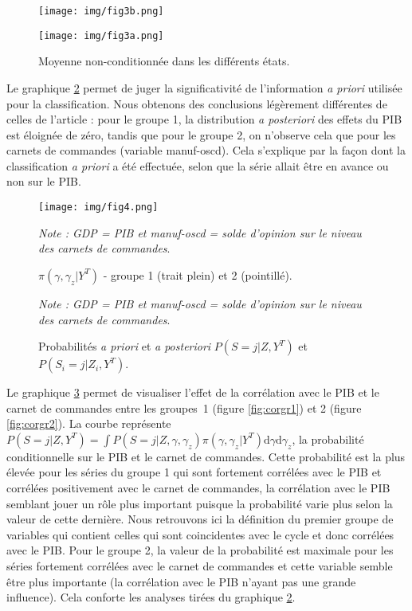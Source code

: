 \documentclass[10pt,french,french]{article}
\begin{document}
\begin{figure}[htb]
\begin{minipage}{.5\textwidth}
\texttt{[image: img/fig3b.png]}
\end{minipage}
\hfill
\begin{minipage}{.5\textwidth}
\texttt{[image: img/fig3a.png]}
\end{minipage}
\caption{Moyenne non-conditionnée dans les différents états.}
\label{etats}
\end{figure}

Le graphique \ref{pi-gamma} permet de juger la significativité de l'information \emph{a priori} utilisée pour la classification.
Nous obtenons des conclusions légèrement différentes de celles de l'article : pour le groupe 1, la distribution \emph{a posteriori} des effets du PIB est éloignée de zéro, tandis que pour le groupe 2, on n'observe cela que pour les carnets de commandes (variable manuf-oscd).
Cela s'explique par la façon dont la classification \emph{a priori} a été effectuée, selon que la série allait être en avance ou non sur le PIB.

\begin{figure}[htb]
\centering
\texttt{[image: img/fig4.png]}
\caption{$\pi(\gamma,\gamma_z|Y^T)$ - groupe 1 (trait plein) et 2 (pointillé).}
\label{pi-gamma}
\footnotesize
\emph{Note : GDP = PIB et manuf-oscd = solde d'opinion sur le niveau des carnets de commandes}.
\end{figure}

\begin{figure}[htb] \centering
{}
\caption{Probabilités \textit{a priori} et \textit{a posteriori} $P(S = j|Z,Y^T)$ et $P(S_i = j|Z_i,Y^T)$.}
\label{graph3d}
\footnotesize
\emph{Note : GDP = PIB et manuf-oscd = solde d'opinion sur le niveau des carnets de commandes}.
\end{figure}

Le graphique \ref{graph3d} permet de visualiser l'effet de la corrélation avec le PIB et le carnet de commandes entre les groupes~1 (figure \ref{fig:corgr1}) et 2 (figure \ref{fig:corgr2}).
La courbe représente \(P(S = j|Z,Y^T) = \int P(S=j|Z,\gamma,\gamma_z)\pi(\gamma,\gamma_z|Y^T)\mathrm{d}\gamma\mathrm{d}\gamma_z\), la probabilité conditionnelle sur le PIB et le carnet de commandes.
Cette probabilité est la plus élevée pour les séries du groupe 1 qui sont fortement corrélées avec le PIB et corrélées positivement avec le carnet de commandes, la corrélation avec le PIB semblant jouer un rôle plus important puisque la probabilité varie plus selon la valeur de cette dernière.
Nous retrouvons ici la définition du premier groupe de variables qui contient celles qui sont coincidentes avec le cycle et donc corrélées avec le PIB.
Pour le groupe 2, la valeur de la probabilité est maximale pour les séries fortement corrélées avec le carnet de commandes et cette variable semble être plus importante (la corrélation avec le PIB n'ayant pas une grande influence).
Cela conforte les analyses tirées du graphique \ref{pi-gamma}.
\end{document}
